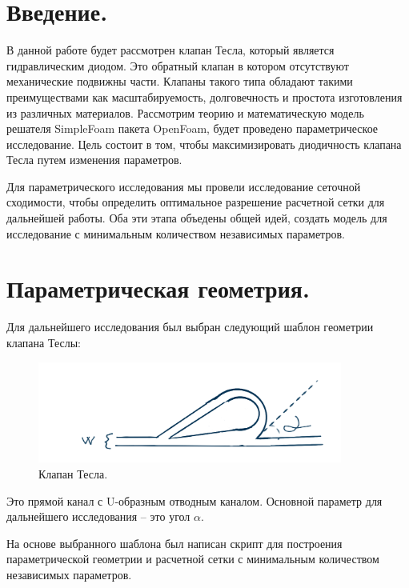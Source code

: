 \documentclass[14pt,a4paper]{article}
\begin{document}
    \section*{Введение.}
    
    В данной работе будет рассмотрен клапан Тесла, который является гидравлическим диодом. Это обратный клапан в котором отсутствуют механические подвижны части. Клапаны такого типа обладают такими преимуществами как масштабируемость, долговечность и простота изготовления из различных материалов. Рассмотрим теорию и математическую модель решателя SimpleFoam пакета OpenFoam, будет проведено параметрическое исследование. Цель состоит в том, чтобы максимизировать диодичность клапана Тесла путем изменения параметров.
    
    Для параметрического исследования мы провели исследование сеточной сходимости, чтобы определить оптимальное разрешение расчетной сетки для дальнейшей работы. Оба эти этапа объедены общей идей, создать модель для исследование с минимальным количеством независимых параметров.
    
    \section*{Параметрическая геометрия.}
        
        Для дальнейшего исследования был выбран следующий шаблон геометрии клапана Теслы:
        
        \begin{figure}[h!]
            \centering
            \includegraphics[width=100mm,scale=0.5]{teslaValve}
            \caption{Клапан Тесла.}
            \label{fig:TeslaValve}
        \end{figure}
        Это прямой канал с U-образным отводным каналом.
        Основной параметр для дальнейшего исследования -- это угол $ \alpha  $.
        
        На основе выбранного шаблона был написан скрипт для построения параметрической геометрии и расчетной сетки с минимальным количеством независимых параметров.
       
\end{document}
